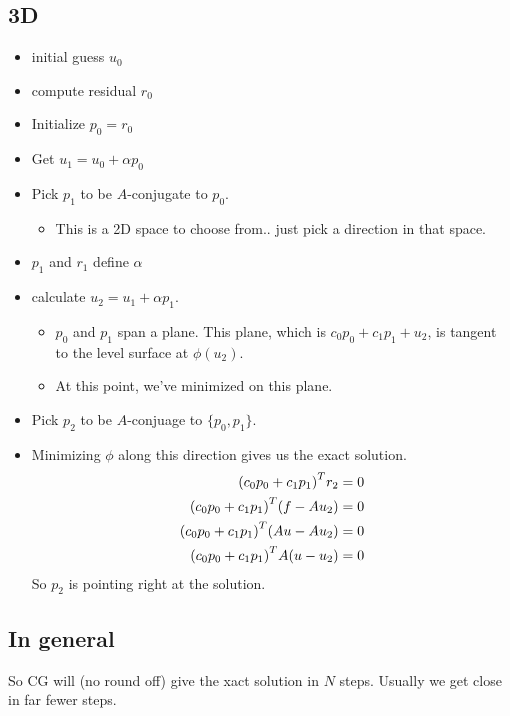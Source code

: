 \documentclass{article}
\begin{document}
        \subsection{3D}
            \begin{itemize}
                \item initial guess $u_0$
                \item compute residual $r_0$
                \item Initialize $p_0 = r_0$
                \item Get $u_1 = u_0 + \alpha p_0$
                \item Pick $p_1$ to be $A$-conjugate to $p_0$.
                \begin{itemize}
                    \item This is a 2D space to choose from.. just pick a direction in that space.
                \end{itemize}
                \item $p_1$ and $r_1$ define $\alpha$
                \item calculate $u_2 = u_1 + \alpha p_1$.
                \begin{itemize}
                    \item $p_0$ and $p_1$ span a plane.  This plane, which is $c_0p_0 + c_1p_1 + u_2$, is tangent to the level surface at $\phi(u_2)$.
                    \item At this point, we've minimized on this plane.
                \end{itemize}
                \item Pick $p_2$ to be $A$-conjuage to $\{p_0,p_1\}$.
                \item Minimizing $\phi$ along this direction gives us the exact solution.
                \begin{align*}
                    \qty(c_0p_0 + c_1p_1)^Tr_2 &= 0 \\
                    \qty(c_0p_0 + c_1p_1)^T(f - Au_2) &= 0 \\
                    \qty(c_0p_0 + c_1p_1)^T(Au - Au_2) &= 0 \\
                    \qty(c_0p_0 + c_1p_1)^TA(u - u_2) &= 0
                \end{align*}
                So $p_2$ is pointing right at the solution.
            \end{itemize}
        \subsection{In general}
            So CG will (no round off) give the xact solution in $N$ steps.  Usually we get close in far fewer steps.
\end{document}
